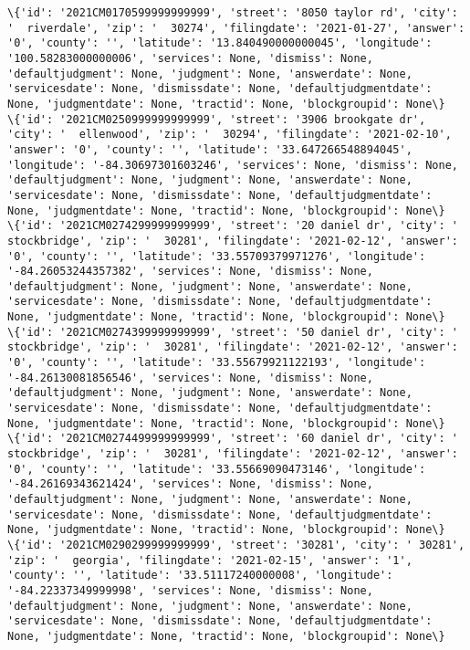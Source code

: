 \documentclass[11pt]{article}
\begin{document}
\begin{Verbatim}[commandchars=\\\{\}]
\{'id': '2021CM0170599999999999', 'street': '8050 taylor rd', 'city': '  riverdale', 'zip': '  30274', 'filingdate': '2021-01-27', 'answer': '0', 'county': '', 'latitude': '13.840490000000045', 'longitude': '100.58283000000006', 'services': None, 'dismiss': None, 'defaultjudgment': None, 'judgment': None, 'answerdate': None, 'servicesdate': None, 'dismissdate': None, 'defaultjudgmentdate': None, 'judgmentdate': None, 'tractid': None, 'blockgroupid': None\}
\{'id': '2021CM0250999999999999', 'street': '3906 brookgate dr', 'city': '  ellenwood', 'zip': '  30294', 'filingdate': '2021-02-10', 'answer': '0', 'county': '', 'latitude': '33.647266548894045', 'longitude': '-84.30697301603246', 'services': None, 'dismiss': None, 'defaultjudgment': None, 'judgment': None, 'answerdate': None, 'servicesdate': None, 'dismissdate': None, 'defaultjudgmentdate': None, 'judgmentdate': None, 'tractid': None, 'blockgroupid': None\}
\{'id': '2021CM0274299999999999', 'street': '20 daniel dr', 'city': '  stockbridge', 'zip': '  30281', 'filingdate': '2021-02-12', 'answer': '0', 'county': '', 'latitude': '33.55709379971276', 'longitude': '-84.26053244357382', 'services': None, 'dismiss': None, 'defaultjudgment': None, 'judgment': None, 'answerdate': None, 'servicesdate': None, 'dismissdate': None, 'defaultjudgmentdate': None, 'judgmentdate': None, 'tractid': None, 'blockgroupid': None\}
\{'id': '2021CM0274399999999999', 'street': '50 daniel dr', 'city': '  stockbridge', 'zip': '  30281', 'filingdate': '2021-02-12', 'answer': '0', 'county': '', 'latitude': '33.55679921122193', 'longitude': '-84.26130081856546', 'services': None, 'dismiss': None, 'defaultjudgment': None, 'judgment': None, 'answerdate': None, 'servicesdate': None, 'dismissdate': None, 'defaultjudgmentdate': None, 'judgmentdate': None, 'tractid': None, 'blockgroupid': None\}
\{'id': '2021CM0274499999999999', 'street': '60 daniel dr', 'city': '  stockbridge', 'zip': '  30281', 'filingdate': '2021-02-12', 'answer': '0', 'county': '', 'latitude': '33.55669090473146', 'longitude': '-84.26169343621424', 'services': None, 'dismiss': None, 'defaultjudgment': None, 'judgment': None, 'answerdate': None, 'servicesdate': None, 'dismissdate': None, 'defaultjudgmentdate': None, 'judgmentdate': None, 'tractid': None, 'blockgroupid': None\}
\{'id': '2021CM0290299999999999', 'street': '30281', 'city': ' 30281', 'zip': '  georgia', 'filingdate': '2021-02-15', 'answer': '1', 'county': '', 'latitude': '33.51117240000008', 'longitude': '-84.22337349999998', 'services': None, 'dismiss': None, 'defaultjudgment': None, 'judgment': None, 'answerdate': None, 'servicesdate': None, 'dismissdate': None, 'defaultjudgmentdate': None, 'judgmentdate': None, 'tractid': None, 'blockgroupid': None\}

\end{Verbatim}
\end{document}
